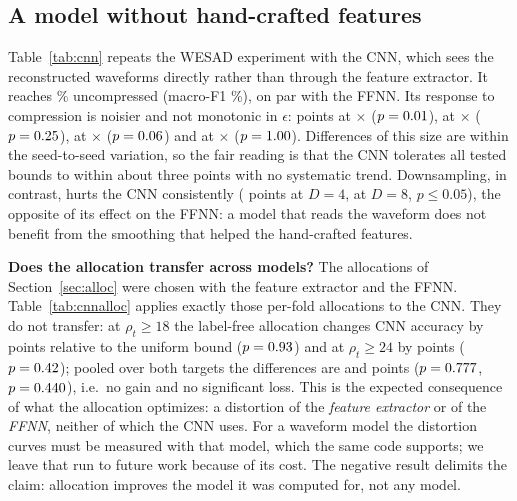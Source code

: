 \documentclass[journal,twoside,web]{ieeecolor}
\begin{document}
\subsection{A model without hand-crafted features}
\begin{table}[t]
\caption{WESAD, 1-D CNN on raw reconstructed waveforms (LOSO, 15 subjects, \cnnNSeeds{} seeds).}
\label{tab:cnn}
\centering\scriptsize
\resizebox{\columnwidth}{!}{}
\end{table}
Table~\ref{tab:cnn} repeats the WESAD experiment with the CNN, which sees the reconstructed waveforms directly rather than through the feature extractor. It reaches \cnnRawAcc\% uncompressed (macro-F1 \cnnRawF\%), on par with the FFNN. Its response to compression is noisier and not monotonic in $\epsilon$: \cnnDAccEb{} points at \ratioEb$\times$ ($p=0.01$), \cnnDAccEd{} at \ratioEd$\times$ ($p=0.25$), \cnnDAccEe{} at \ratioEe$\times$ ($p=0.06$) and \cnnDAccEf{} at \ratioEf$\times$ ($p=1.00$). Differences of this size are within the seed-to-seed variation, so the fair reading is that the CNN tolerates all tested bounds to within about three points with no systematic trend. Downsampling, in contrast, hurts the CNN consistently (\cnnDsDAccD{} points at $D=4$, \cnnDsDAccH{} at $D=8$, $p\le0.05$), the opposite of its effect on the FFNN: a model that reads the waveform does not benefit from the smoothing that helped the hand-crafted features.

\begin{table}[t]
\caption{WESAD: allocations chosen with the feature pipeline evaluated with the CNN (LOSO, \cnnallocNSeeds{} seeds, \cnnallocEpochs{} epochs).}
\label{tab:cnnalloc}
\centering\scriptsize
\resizebox{\columnwidth}{!}{}
\end{table}
\textbf{Does the allocation transfer across models?} The allocations of Section~\ref{sec:alloc} were chosen with the feature extractor and the FFNN. Table~\ref{tab:cnnalloc} applies exactly those per-fold allocations to the CNN. They do not transfer: at $\rho_t\ge18$ the label-free allocation changes CNN accuracy by \cnnallocFeatDiffAH{} points relative to the uniform bound ($p=0.93$) and at $\rho_t\ge24$ by \cnnallocFeatDiffBD{} points ($p=0.42$); pooled over both targets the differences are \cnnallocFeatPooledDiff{} and \cnnallocClfPooledDiff{} points ($p=0.777$, $p=0.440$), i.e.\ no gain and no significant loss. This is the expected consequence of what the allocation optimizes: a distortion of the \emph{feature extractor} or of the \emph{FFNN}, neither of which the CNN uses. For a waveform model the distortion curves must be measured with that model, which the same code supports; we leave that run to future work because of its cost. The negative result delimits the claim: allocation improves the model it was computed for, not any model.
\end{document}
